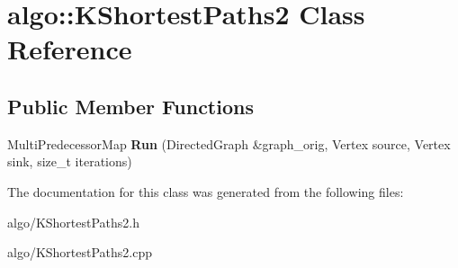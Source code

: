 \hypertarget{classalgo_1_1KShortestPaths2}{}\section{algo\+:\+:K\+Shortest\+Paths2 Class Reference}
\label{classalgo_1_1KShortestPaths2}
\subsection*{Public Member Functions}
\begin{DoxyCompactItemize}
\item 
Multi\+Predecessor\+Map {\bfseries Run} (Directed\+Graph \&graph\+\_\+orig, Vertex source, Vertex sink, size\+\_\+t iterations)\hypertarget{classalgo_1_1KShortestPaths2_aa0b3f4423e06c36929181f4cb77f82d5}{}\label{classalgo_1_1KShortestPaths2_aa0b3f4423e06c36929181f4cb77f82d5}

\end{DoxyCompactItemize}


The documentation for this class was generated from the following files\+:\begin{DoxyCompactItemize}
\item 
algo/K\+Shortest\+Paths2.\+h\item 
algo/K\+Shortest\+Paths2.\+cpp\end{DoxyCompactItemize}
